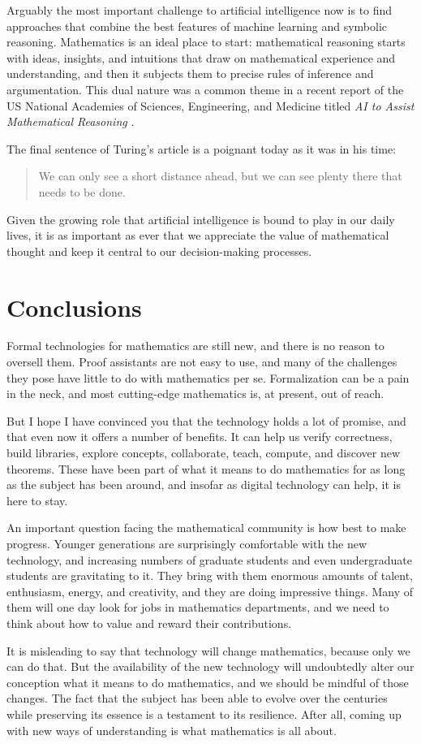 \documentclass[12pt]{amsart}
\theoremstyle{definition}
\theoremstyle{remark}
\numberwithin{equation}{section}
\begin{document}
Arguably the most important challenge to artificial intelligence now is to find approaches that combine the best features of machine learning and symbolic reasoning. Mathematics is an ideal place to start: mathematical reasoning starts with ideas, insights, and intuitions that draw on mathematical experience and understanding, and then it subjects them to precise rules of inference and argumentation. This dual nature was a common theme in a recent report of the US National Academies of Sciences, Engineering, and Medicine titled \emph{AI to Assist Mathematical Reasoning} \cite{national:academies:23}.

The final sentence of Turing's article is a poignant today as it was in his time:
\begin{quote}
We can only see a short distance ahead, but we can see plenty there that needs to be done.
\end{quote}
Given the growing role that artificial intelligence is bound to play in our daily lives, it is as important as ever that we appreciate the value of mathematical thought and keep it central to our decision-making processes.

\section*{Conclusions}

Formal technologies for mathematics are still new, and there is no reason to oversell them. Proof assistants are not easy to use, and many of the challenges they pose have little to do with mathematics per se. Formalization can be a pain in the neck, and most cutting-edge mathematics is, at present, out of reach.

But I hope I have convinced you that the technology holds a lot of promise, and that even now it offers a number of benefits. It can help us verify correctness, build libraries, explore concepts, collaborate, teach, compute, and discover new theorems. These have been part of what it means to do mathematics for as long as the subject has been around, and insofar as digital technology can help, it is here to stay.

An important question facing the mathematical community is how best to make progress. Younger generations are surprisingly comfortable with the new technology, and increasing numbers of graduate students and even undergraduate students are gravitating to it. They bring with them enormous amounts of talent, enthusiasm, energy, and creativity, and they are doing impressive things. Many of them will one day look for jobs in mathematics departments, and we need to think about how to value and reward their contributions.

It is misleading to say that technology will change mathematics, because only we can do that. But the availability of the new technology will undoubtedly alter our conception what it means to do mathematics, and we should be mindful of those changes. The fact that the subject has been able to evolve over the centuries while preserving its essence is a testament to its resilience. After all, coming up with new ways of understanding is what mathematics is all about.



\end{document}

